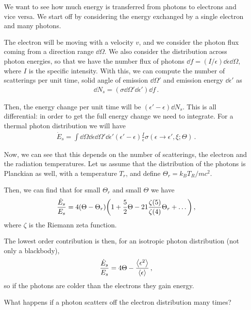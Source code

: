 \documentclass[main.tex]{subfiles}
\begin{document}
We want to see how much energy is transferred from photons to electrons and vice versa. We start off by considering the energy exchanged by a single electron and many photons. 

The electron will be moving with a velocity \(v\), and we consider the photon flux coming from a direction range \(\dd{\Omega }\). We also consider the distribution across photon energies, so that we have the number flux of photons \(\dd{f} = (I/\epsilon ) \dd{\epsilon } \dd{\Omega }\), where \(I\) is the specific intensity.
With this, we can compute the number of scatterings per unit time, solid angle of emission \(\dd{\Omega }' \) and emission energy \(\dd{\epsilon }'\) as 
%
\begin{align}
\dd{N_s} = (\sigma \dd{\Omega }' \dd{\epsilon }') \dd{f}
\,.
\end{align}

Then, the energy change per unit time will be \((\epsilon' - \epsilon ) \dd{N_s}\). 
This is all differential: in order to get the full energy change we need to integrate. For a thermal photon distribution we will have 
%
\begin{align}
\dot{E}_s = \int \dd{\Omega } \dd{\epsilon } \dd{\Omega }' \dd{\epsilon }' 
(\epsilon ' - \epsilon ) \frac{I}{\epsilon } \sigma (\epsilon \to \epsilon ' , \xi ; \Theta )
\,.
\end{align}

Now, we can see that this depends on the number of scatterings, the electron and the radiation temperatures. 
Let us assume that the distribution of the photons is Planckian as well, with a temperature \(T_r\), and define \(\Theta _r = k_B T_R / m c^2\). 

Then, we can find that for small \(\Theta _r\) and small \(\Theta \) we have 
%
\begin{align}
\frac{\dot{E}_s}{E_s} = 4 \qty(\Theta - \Theta _r) \qty(1 + \frac{5}{2} \Theta - 21 \frac{\zeta (5)}{\zeta (4)} \Theta _r + \dots)
\,,
\end{align}
%
where \(\zeta \) is  the Riemann zeta function.

The lowest order contribution is then, for an isotropic photon distribution (not only a blackbody),
%
\begin{align}
\frac{\dot{E}_s}{E_s} = 4 \Theta - \frac{\expval{\epsilon^2}}{\expval{\epsilon }}
\,,
\end{align}
%
so if the photons are colder than the electrons they gain energy. 

What happens if a photon scatters off the electron distribution many times? 
\end{document}
